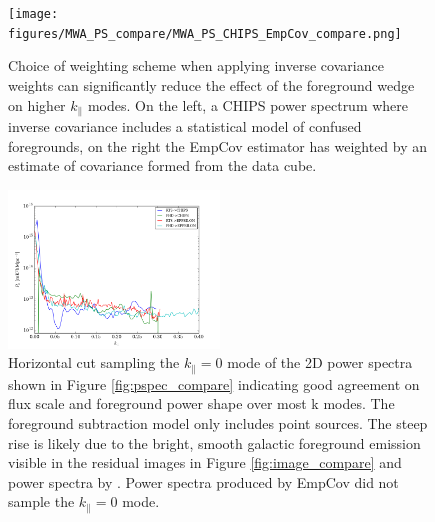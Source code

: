 \documentclass[twolcolumn,iop]{emulateapj}
\def\empirical{EmpCov}
\begin{document}
\begin{figure}[htbp]
\begin{center}
\texttt{[image: figures/MWA\_PS\_compare/MWA\_PS\_CHIPS\_EmpCov\_compare.png]}
\caption{\label{fig:weighted_2d} Choice of weighting scheme when applying inverse covariance weights can significantly reduce the effect of the foreground wedge on higher $k_\parallel$ modes.  On the left, a CHIPS power spectrum where inverse covariance includes a statistical model of confused foregrounds, on the right the \empirical{} estimator has weighted by an estimate of covariance formed from the data cube. }
\end{center}
\end{figure}

\begin{figure}[htbp]
\begin{center}
\includegraphics[width=0.5\textwidth]{figures/MWAPipeline_compare_1d_kperp.png}
\caption{Horizontal cut sampling the $k_\parallel = 0$ mode of the 2D power spectra shown in Figure \ref{fig:pspec_compare} indicating good agreement on flux scale and foreground power shape over most k modes. The foreground subtraction model only includes point sources. The steep rise is likely due to the bright, smooth galactic foreground emission visible in the residual images in Figure \ref{fig:image_compare} and power spectra by \cite{2015ApJ...807L..28T}. Power spectra produced by \empirical{} did not sample the $k_\parallel=0$ mode.}
\label{fig:1d_kperp}
\end{center}
\end{figure}
\end{document}
